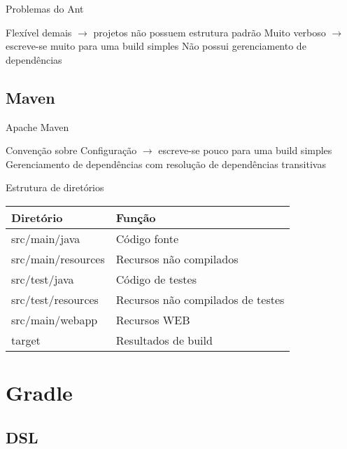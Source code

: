 \documentclass{beamer}
\begin{document}
\begin{frame}{Problemas do Ant}
 \begin{outline}
    Flexível demais $\rightarrow$ projetos não possuem estrutura padrão
    Muito verboso $\rightarrow$ escreve-se muito para uma build simples
    Não possui gerenciamento de dependências
 \end{outline}
\end{frame}

\subsection{Maven}

\begin{frame}{Apache Maven}
 \begin{outline}
    Convenção sobre Configuração $\rightarrow$ escreve-se pouco para uma build simples
    Gerenciamento de dependências com resolução de dependências transitivas
 \end{outline}
\end{frame}

\begin{frame}{Estrutura de diretórios}
 \begin{table}[]
    \begin{tabular}{@{}ll@{}}
      \toprule
      Diretório           & Função                            \\ \midrule
      src/main/java       & Código fonte                      \\
      src/main/resources  & Recursos não compilados           \\
      src/test/java       & Código de testes                  \\
      src/test/resources  & Recursos não compilados de testes \\
      src/main/webapp     & Recursos WEB                      \\
      target              & Resultados de build               \\ \bottomrule
    \end{tabular}
  \end{table}
\end{frame}




\section{Gradle}

\subsection{DSL}
\end{document}
